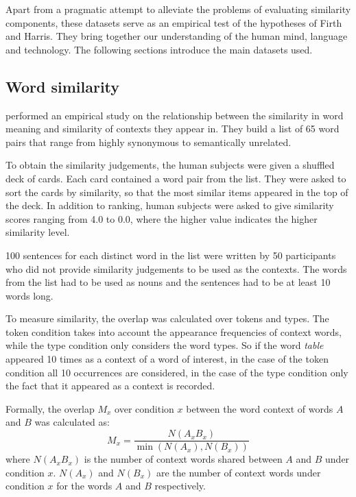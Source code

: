 Apart from a pragmatic attempt to alleviate the problems of evaluating
similarity components, these datasets serve as an empirical test of the
hypotheses of Firth and Harris. They bring together our understanding of the human mind, language and technology. The following sections introduce the main datasets used.

\subsection{Word similarity}
\label{sec:lexical-similarity}

 performed an empirical study on the relationship between the similarity in word meaning and similarity of contexts they appear in. They build a list of 65 word pairs that range from highly synonymous to semantically unrelated.

To obtain the similarity judgements, the human subjects were given a shuffled deck of cards. Each card contained a word pair from the list. They were asked to sort the cards by similarity, so that the most similar items appeared in the top of the deck. In addition to ranking, human subjects were asked to give similarity scores ranging from 4.0 to 0.0, where the higher value indicates the higher similarity level.

100 sentences for each distinct word in the list were written by 50 participants who did not provide similarity judgements to be used as the contexts. The words from the list had to be used as nouns and the sentences had to be at least 10 words long.

To measure similarity, the overlap was calculated over tokens and types. The token condition takes into account the appearance frequencies of context words, while the type condition only considers the word types. So if the word \textit{table} appeared 10 times as a context of a word of interest, in the case of the token condition all 10 occurrences are considered, in the case of the type condition only the fact that it appeared as a context is recorded.

Formally, the overlap $M_x$ over condition $x$ between the word context of words $A$ and $B$ was calculated as:
%
\begin{equation*}
  M_x = \frac{N(A_xB_x)}{\min(N(A_x), N(B_x))}
\end{equation*}
%
where $N(A_xB_x)$ is the number of context words shared between $A$ and $B$ under condition $x$. $N(A_x)$ and $N(B_x)$ are the number of context words under condition $x$ for the words $A$ and $B$ respectively.


